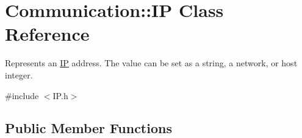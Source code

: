 \hypertarget{class_communication_1_1_i_p}{}\section{Communication\+:\+:I\+P Class Reference}
\label{class_communication_1_1_i_p}


Represents an \hyperlink{class_communication_1_1_i_p}{I\+P} address. The value can be set as a string, a network, or host integer.  




{\ttfamily \#include $<$I\+P.\+h$>$}

\subsection*{Public Member Functions}
